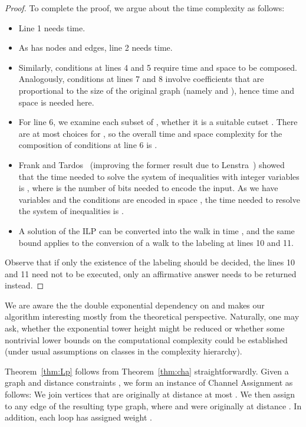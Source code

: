 \documentclass[a4paper,UKenglish]{lipics}
\theoremstyle{plain}
\theoremstyle{definition}
\begin{document}
{\begin{proof}
To complete the proof, we argue about the time complexity as follows:
\begin{itemize}
\item Line 1 needs  time.
\item As  has  nodes and  edges, line 2 needs  time.
\item Similarly, conditions at lines 4 and 5
require  time and space to be composed. Analogously, conditions at lines 7 and 8 involve coefficients that are proportional to the size of the original graph  (namely  and ), hence  time and space is needed here.
\item For line 6, we examine each subset of , whether it is a suitable cutset .
There are at most  choices for , so the overall time and space complexity 
for the composition of conditions at line 6 is .
\item Frank and Tardos~\cite{m:FrankTardos87} (improving the former result due to Lenstra~\cite{m:Lenstra83}) showed that the time needed to solve the system of inequalities with  integer variables is , where  is the number of bits needed to encode the input. As we have  variables and the conditions are encoded in space , the time needed to resolve the system of inequalities is .
\item A solution of the ILP can be converted into the walk in time , and the same bound applies to the conversion of a walk to the labeling at lines 10 and 11.
\end{itemize}

Observe that if only the existence of the labeling should be decided, the lines 10 and 11 need not to be executed, only an affirmative answer needs to be returned instead.
\end{proof}

We are aware the the double exponential dependency on  and  makes our algorithm interesting 
mostly from the theoretical perspective. Naturally, one may ask, whether the exponential tower height might be reduced
or whether some nontrivial lower bounds on the computational complexity could be established 
(under usual assumptions on classes in the complexity hierarchy). 

\iffalse


Theorem~\ref{thm:Lp} follows from Theorem~\ref{thm:cha} straightforwardly. Given a graph  and distance constraints ,
we form an instance of {\sc Channel Assignment} as follows: We join vertices  that are originally at distance at most . We then assign  to any edge  of the resulting type graph, where  and  were originally at distance . In addition, each loop has assigned weight .

}
\end{document}
